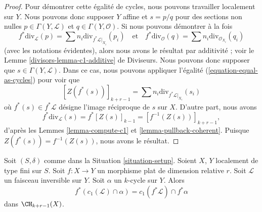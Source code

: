 \begin{proof}
Pour démontrer cette égalité de cycles, nous pouvons travailler localement sur $Y$.
Nous pouvons donc supposer $Y$ affine et $s = p/q$ pour des sections non nulles
$p \in \Gamma(Y, \mathcal{L})$ et $q \in \Gamma(Y, \mathcal{O})$.
Si nous pouvons démontrer à la fois
$$
f^*\text{div}_\mathcal{L}(p) =
\sum n_i\text{div}_{f^*\mathcal{L}|_{X_i}}(p_i)
\quad\text{et}\quad
f^*\text{div}_\mathcal{O}(q) =
\sum n_i\text{div}_{\mathcal{O}_{X_i}}(q_i)
$$
(avec les notations évidentes), alors nous avons le résultat par
additivité ; voir le Lemme \ref{divisors-lemma-c1-additive} de Diviseurs.
Nous pouvons donc supposer que $s \in \Gamma(Y, \mathcal{L})$.
Dans ce cas, nous pouvons appliquer l'égalité
(\ref{equation-equal-as-cycles}) pour voir que
$$
[Z(f^*(s))]_{k + r - 1} =
\sum n_i\text{div}_{f^*\mathcal{L}|_{X_i}}(s_i)
$$
où $f^*(s) \in f^*\mathcal{L}$ désigne l'image réciproque de $s$ sur $X$.
D'autre part, nous avons
$$
f^*\text{div}_\mathcal{L}(s) = f^*[Z(s)]_{k - 1}
= [f^{-1}(Z(s))]_{k + r - 1},
$$
d'après les Lemmes \ref{lemma-compute-c1} et \ref{lemma-pullback-coherent}.
Puisque $Z(f^*(s)) = f^{-1}(Z(s))$, nous avons le résultat.
\end{proof}

\begin{lemma}
\label{lemma-flat-pullback-cap-c1}
Soit $(S, \delta)$ comme dans la Situation \ref{situation-setup}.
Soient $X$, $Y$ localement de type fini sur $S$.
Soit $f : X \to Y$ un morphisme plat de dimension relative $r$.
Soit $\mathcal{L}$ un faisceau inversible sur $Y$.
Soit $\alpha$ un $k$-cycle sur $Y$.
Alors
$$
f^*(c_1(\mathcal{L}) \cap \alpha) = c_1(f^*\mathcal{L}) \cap f^*\alpha
$$
dans $\CH_{k + r - 1}(X)$.
\end{lemma}

